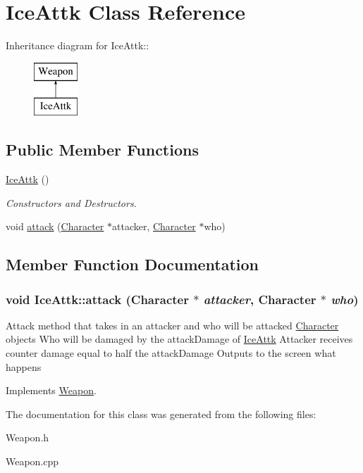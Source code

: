 \hypertarget{classIceAttk}{
\section{IceAttk Class Reference}
\label{classIceAttk}
}
Inheritance diagram for IceAttk::\begin{figure}[H]
\begin{center}
\leavevmode
\includegraphics[height=2cm]{classIceAttk}
\end{center}
\end{figure}
\subsection*{Public Member Functions}
\begin{DoxyCompactItemize}
\item 
\hypertarget{classIceAttk_a02184f028f162a82bd97e0ef14c027f6}{
\hyperlink{classIceAttk_a02184f028f162a82bd97e0ef14c027f6}{IceAttk} ()}
\label{classIceAttk_a02184f028f162a82bd97e0ef14c027f6}

\begin{DoxyCompactList}\small\item\em Constructors and Destructors. \item\end{DoxyCompactList}\item 
void \hyperlink{classIceAttk_a4284b30231a9881ebc34fc3e01cc17cc}{attack} (\hyperlink{classCharacter}{Character} $\ast$attacker, \hyperlink{classCharacter}{Character} $\ast$who)
\end{DoxyCompactItemize}


\subsection{Member Function Documentation}
\hypertarget{classIceAttk_a4284b30231a9881ebc34fc3e01cc17cc}{
\subsubsection[{attack}]{\setlength{\rightskip}{0pt plus 5cm}void IceAttk::attack ({\bf Character} $\ast$ {\em attacker}, \/  {\bf Character} $\ast$ {\em who})}}
\label{classIceAttk_a4284b30231a9881ebc34fc3e01cc17cc}
Attack method that takes in an attacker and who will be attacked \hyperlink{classCharacter}{Character} objects Who will be damaged by the attackDamage of \hyperlink{classIceAttk}{IceAttk} Attacker receives counter damage equal to half the attackDamage Outputs to the screen what happens 

Implements \hyperlink{classWeapon_a74d99dd40d8872718710bcf94fff98d7}{Weapon}.

The documentation for this class was generated from the following files:\begin{DoxyCompactItemize}
\item 
Weapon.h\item 
Weapon.cpp\end{DoxyCompactItemize}
